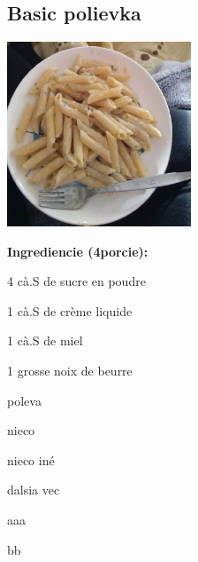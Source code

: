 \setcounter{step}{0}

\subsection{ Basic polievka }

\begin{ingredient}
  
      \includegraphics[height=5.5cm]{images/cestoviny}
  
  \def\portions{  }
  \textbf{ {\normalsize Ingrediencie (4porcie):} }

  \begin{main}
      \item 4 cà.S de sucre en poudre
      \item 1 cà.S de crème liquide
      \item 1 cà.S de miel
      \item 1 grosse noix de beurre
  \end{main}
  
    \begin{subingredient}{poleva}
        \item nieco
        \item nieco iné
    \end{subingredient}
  
    \begin{subingredient}{dalsia vec}
        \item aaa
        \item bb
    \end{subingredient}
  
\end{ingredient}
